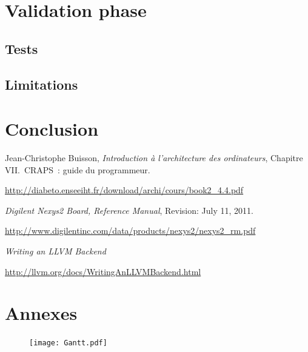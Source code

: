 \documentclass[openany, a4paper]{book}
\begin{document}
  \chapter{Validation phase}

    \section{Tests}

    \section{Limitations}

  \chapter{Conclusion}

  \begin{thebibliography}{9}
      Jean-Christophe Buisson,
      \emph{Introduction à l'architecture des ordinateurs},
      Chapitre VII.\ CRAPS~: guide du programmeur.

      \mbox{\url{http://diabeto.enseeiht.fr/download/archi/cours/book2_4.4.pdf}}

      \emph{Digilent Nexys2 Board, Reference Manual},
      Revision: July 11, 2011.

      \mbox{\url{http://www.digilentinc.com/data/products/nexys2/nexys2_rm.pdf}}

      \emph{Writing an LLVM Backend}

      \mbox{\url{http://llvm.org/docs/WritingAnLLVMBackend.html}}
  \end{thebibliography}

  \chapter*{Annexes}
    \thispagestyle{empty}
    \begin{figure}
      \centering
      \texttt{[image: Gantt.pdf]}
      \label{fig:gantt}
    \end{figure}
    \clearpage
    \restoregeometry
\end{document}
